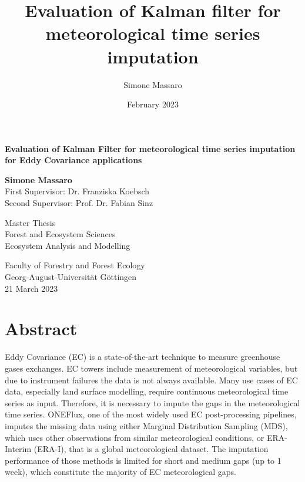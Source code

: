 \documentclass{article}
\title{Evaluation of Kalman filter for meteorological time series imputation}
\author{Simone Massaro}
\date{February 2023}
\let\Oldsection\section
\renewcommand{\section}{\FloatBarrier\Oldsection}
\begin{document}
\newcommand{\vv}[1]{\texttt{#1}}

\begin{titlepage}
    \begin{center}
        \vspace*{1cm}
            
        \Huge
        \textbf{Evaluation of Kalman Filter for meteorological time series imputation for Eddy Covariance applications}
            
        \vspace{0.5cm}
        \LARGE
            
        \vspace{1.5cm}
            
        \textbf{Simone Massaro} \\
        \vspace{1.5cm}
        \Large
        First Supervisor: Dr. Franziska Koebsch\\
        Second Supervisor: Prof. Dr. Fabian Sinz 
        \vfill
            
        Master Thesis\\
        Forest and Ecosystem Sciences\\
        Ecosystem Analysis and Modelling
            
        \vspace{0.8cm}
            
        \Large
        Faculty of Forestry and Forest Ecology \\
        Georg-August-Universität Göttingen \\
        \vspace{1cm}
        21 March 2023
            
    \end{center}
\end{titlepage}
\clearpage

\section*{Abstract}

Eddy Covariance (EC) is a state-of-the-art technique to measure greenhouse gases exchanges. EC towers include measurement of meteorological variables, but due to instrument failures the data is not always available. Many use cases of EC data, especially land surface modelling, require continuous meteorological time series as input. Therefore, it is necessary to impute the gaps in the meteorological time series. ONEFlux, one of the most widely used EC post-processing pipelines, imputes the missing data using either Marginal Distribution Sampling (MDS), which uses other observations from similar meteorological conditions, or ERA-Interim (ERA-I), that is a global meteorological dataset. The imputation performance of those methods is limited for short and medium gaps (up to 1 week), which constitute the majority of EC meteorological gaps.
\end{document}
